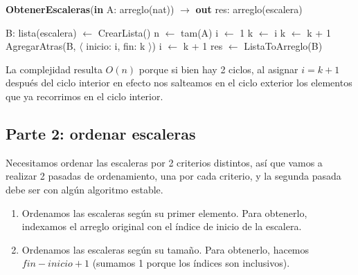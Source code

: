 \begin{algorithm}[H]
\caption{
    \textbf{ObtenerEscaleras}(\textbf{in} A: arreglo(nat)) $\to$ \textbf{out} res: arreglo(escalera)
}
\begin{algorithmic}[1]
    \State B: lista(escalera) $\gets$ CrearLista() 
    \State n $\gets$ tam(A)
    \State i $\gets$ 1
     
        \State k $\gets$ i
         
            \State k $\gets$ k + 1
        \EndWhile
        \State AgregarAtras(B, $\langle$ inicio: i, fin: k $\rangle$) 
        \State i $\gets$ k + 1
    \EndWhile
    \State res $\gets$ ListaToArreglo(B) 
\end{algorithmic}
\end{algorithm}

La complejidad resulta $O(n)$ porque si bien hay 2 ciclos, al asignar $i = k + 1$ después del ciclo interior en efecto nos salteamos en el ciclo exterior los elementos que ya recorrimos en el ciclo interior.

\subsection*{Parte 2: ordenar escaleras}


Necesitamos ordenar las escaleras por 2 criterios distintos, así que vamos a realizar 2 pasadas de ordenamiento, una por cada criterio, y la segunda pasada debe ser con algún algoritmo estable.


\begin{enumerate}
    \item Ordenamos las escaleras según su primer elemento. Para obtenerlo, indexamos el arreglo original con el índice de inicio de la escalera.
    \item Ordenamos las escaleras según su tamaño. Para obtenerlo, hacemos $fin - inicio + 1$ (sumamos 1 porque los índices son inclusivos).
\end{enumerate}


